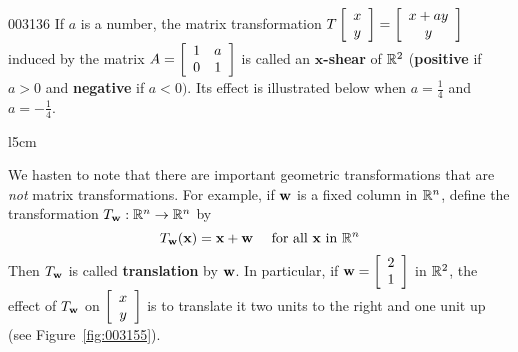 \begin{example}{}{003136}
If $a$ is a number, the matrix transformation $T \left[ \begin{array}{c}
x \\
y
\end{array} \right] = \left[ \begin{array}{c}
x + ay \\
y
\end{array} \right]$
 induced by the matrix $A = \left[ \begin{array}{cc}
 1 & a \\
 0 & 1
 \end{array} \right]$
 is called an $\bm{x}$\textbf{-shear} of $\mathbb{R}^2$ (\textbf{positive} if $a > 0$ and \textbf{negative} if $a < 0)$. Its effect is illustrated below when $a = \frac{1}{4}$ and $a = -\frac{1}{4}$.


\begin{center}
	
\end{center}
\end{example}

\begin{wrapfigure}[8]{l}{5cm} 
        \vspace*{-2em}
	\centering
	
	\caption{\label{fig:003155}}
\end{wrapfigure}
We hasten to note that there are important geometric transformations that are \textit{not} matrix transformations. For example, if $\textbf{w}$ is a fixed column in $\mathbb{R}^n$, define the transformation $T_{\textbf{w}} : \mathbb{R}^n \to \mathbb{R}^n$ by
\begin{equation*}
T_{\textbf{w}}(\textbf{x}) = \textbf{x} + \textbf{w} \quad \mbox{ for all } \textbf{x} \mbox{ in } \mathbb{R}^{n}
\end{equation*}
Then $T_{\textbf{w}}$ is called \textbf{translation} by $\textbf{w}$. In particular, if $\textbf{w} = \left[ \begin{array}{r}
2 \\
1
\end{array} \right]$
 in $\mathbb{R}^2$, the effect of $T_{\textbf{w}}$ on $\left[ \begin{array}{c}
x \\
y
\end{array} \right]$
 is to translate it two units to the right and one unit up (see Figure~\ref{fig:003155}).

